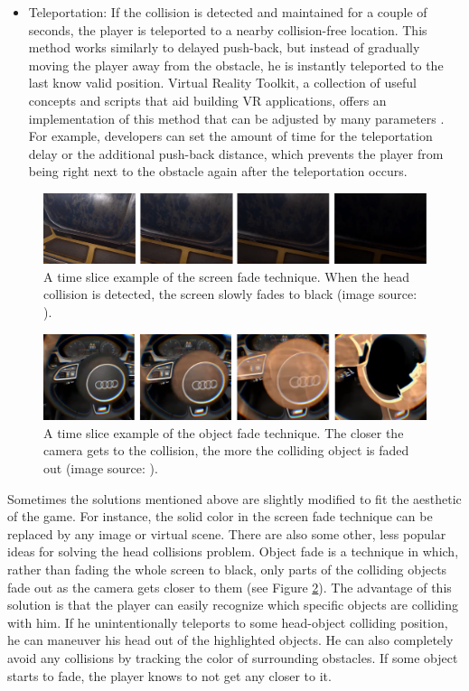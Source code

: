 \begin{itemize}
\item Teleportation: If the collision is detected and maintained for a couple of seconds, the player is teleported to a nearby collision-free location. This method works similarly to delayed push-back, but instead of gradually moving the player away from the obstacle, he is instantly teleported to the last know valid position. Virtual Reality Toolkit, a collection of useful concepts and scripts that aid building VR applications, offers an implementation of this method that can be adjusted by many parameters \cite{VRTK_REWIND}. For example, developers can set the amount of time for the teleportation delay or the additional push-back distance, which prevents the player from being right next to the obstacle again after the teleportation occurs. 
\end{itemize}

\begin{figure}[th]
\centering
\includegraphics[width=1\textwidth]{img/screen_fade.png}
\caption{A time slice example of the screen fade technique. When the head collision is detected, the screen slowly fades to black (image source: \cite{SCREENFADE}).}
\label{fig:SCREENFADEIMAGE}
\end{figure}

\begin{figure}[th]
\centering
\includegraphics[width=1\textwidth]{img/object_fade.png}
\caption{A time slice example of the object fade technique. The closer the camera gets to the collision, the more the colliding object is faded out (image source: \cite{OBJECTFADE}).}
\label{fig:OBJECTFADEIMAGE}
\end{figure}

Sometimes the solutions mentioned above are slightly modified to fit the aesthetic of the game. For instance, the solid color in the screen fade technique can be replaced by any image or virtual scene. There are also some other, less popular ideas for solving the head collisions problem. Object fade is a technique in which, rather than fading the whole screen to black, only parts of the colliding objects fade out as the camera gets closer to them (see Figure \ref{fig:OBJECTFADEIMAGE}). The advantage of this solution is that the player can easily recognize which specific objects are colliding with him. If he unintentionally teleports to some head-object colliding position, he can maneuver his head out of the highlighted objects. He can also completely avoid any collisions by tracking the color of surrounding obstacles. If some object starts to fade, the player knows to not get any closer to it. 

